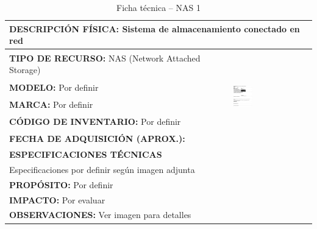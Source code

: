 \begin{table}[H]
\centering
\caption{Ficha técnica -- NAS 1}
\label{tab:nas-1}
\begin{tabular}{|p{}|p{}|}
\hline
\multicolumn{2}{|l|}{\textbf{DESCRIPCIÓN FÍSICA:} Sistema de almacenamiento conectado en red} \\ \hline
\textbf{TIPO DE RECURSO:} NAS (Network Attached Storage) & 
\multirow{5}{*}{\includegraphics[width=0.25\textwidth,height=4cm,keepaspectratio]{tablas-images/cp1/NAS/nas-1.png}} \\ \cline{1-1}
\textbf{MODELO:} Por definir & \\ \cline{1-1}
\textbf{MARCA:} Por definir & \\ \cline{1-1}
\textbf{CÓDIGO DE INVENTARIO:} Por definir & \\ \cline{1-1}
\textbf{FECHA DE ADQUISICIÓN (APROX.):} & \\ \hline
\multicolumn{2}{|l|}{\textbf{ESPECIFICACIONES TÉCNICAS}} \\ \hline
\multicolumn{2}{|p{0.95\textwidth}|}{
\footnotesize
Especificaciones por definir según imagen adjunta
} \\ \hline
\multicolumn{2}{|l|}{\textbf{PROPÓSITO:} Por definir} \\ \hline
\multicolumn{2}{|l|}{\textbf{IMPACTO:} Por evaluar} \\ \hline
\multicolumn{2}{|l|}{\textbf{OBSERVACIONES:} Ver imagen para detalles} \\ \hline
\end{tabular}
\end{table}

